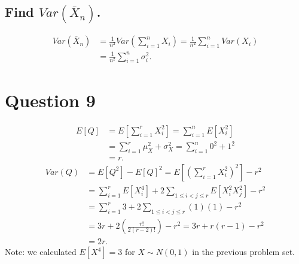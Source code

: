 \documentclass[11pt]{article} %
\begin{document}
\subsection{Find $Var(\bar{X}_n)$.}
\begin{align*}
Var(\bar{X}_n) &= \frac{1}{n^2}Var(\sum_{i=1}^n X_i) = \frac{1}{n^2}\sum_{i=1}^n Var(X_i) \\
&=  \frac{1}{n^2}\sum_{i=1}^n \sigma_i^2.
\end{align*}
\section{Question 9}
\begin{align*}
E[Q] &= E\left[ \sum_{i=1}^r X_i^2 \right] = \sum_{i=1}^n E\left[ X_i^2 \right]  \\
&=  \sum_{i=1}^r \mu_X^2 + \sigma_X^2 = \sum_{i=1}^n 0^2 + 1^2\\
&=  r.
\end{align*}
\begin{align*}
Var(Q) &= E[Q^2] - E[Q]^2 = E\left[\left(\sum_{i=1}^r X_i^2 \right)^2\right] - r^2\\
&= \sum_{i=1}^r E\left[X_i^4\right] + 2\sum_{1\leq i < j \leq r}E\left[ X_i^2X_j^2\right] -r^2 \\
&= \sum_{i=1}^r 3 + 2\sum_{1\leq i < j \leq r}(1)(1) -r^2 \\
&= 3r + 2\left( \frac{r!}{2(r-2)!}\right) -r^2 = 3r + r(r-1) -r^2 \\
&= 2r.
\end{align*}
Note: we calculated $E[X^4]=3$ for $X \sim N(0,1)$ in the previous problem set.
\end{document}
